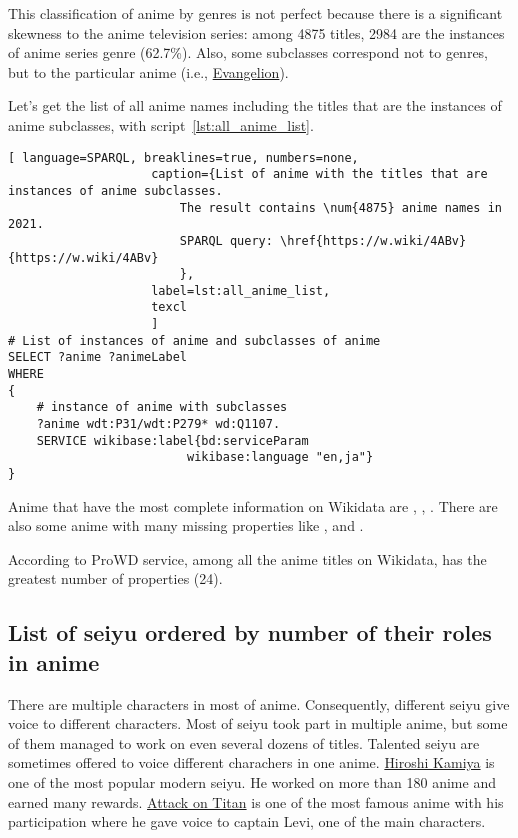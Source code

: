 This classification of anime by genres is not perfect because there is a significant skewness to the anime television series: among \num{4875} titles, \num{2984} are the instances of anime series genre (\num{62,7}\%). Also, some subclasses correspond not to genres, but to the particular anime (i.e., \href{https://w.wiki/3iKe}{Evangelion}).

Let's get the list of all anime names including the titles that are the instances of anime subclasses, with script~\protect\ref{lst:all_anime_list}.

\begin{lstlisting}[ language=SPARQL, breaklines=true, numbers=none,
                    caption={List of anime with the titles that are instances of anime subclasses.
                        The result contains \num{4875} anime names in 2021.
                        SPARQL query: \href{https://w.wiki/4ABv}{https://w.wiki/4ABv}
                        },
                    label=lst:all_anime_list,
                    texcl 
                    ]
# List of instances of anime and subclasses of anime
SELECT ?anime ?animeLabel
WHERE
{
    # instance of anime with subclasses
    ?anime wdt:P31/wdt:P279* wd:Q1107.
    SERVICE wikibase:label{bd:serviceParam
					     wikibase:language "en,ja"}
}
\end{lstlisting}%

Anime that have the most complete information on Wikidata are , , . There are also some anime with many missing properties like ,  and .

According to ProWD service, among all the anime titles on Wikidata,  has the greatest number of properties (\num{24}).

\subsection{List of seiyu ordered by number of their roles in anime}

There are multiple characters in most of anime. Consequently, different seiyu give voice to different characters. Most of seiyu took part in multiple anime, but some of them managed to work on even several dozens of titles. Talented seiyu are sometimes offered to voice different charachers in one anime. \href{https://w.wiki/4UFa}{Hiroshi Kamiya} is one of the most popular modern seiyu. He worked on more than 180 anime and earned many rewards. \href{https://w.wiki/4UFh}{Attack on Titan} is one of the most famous anime with his participation where he gave voice to captain Levi, one of the main characters.

